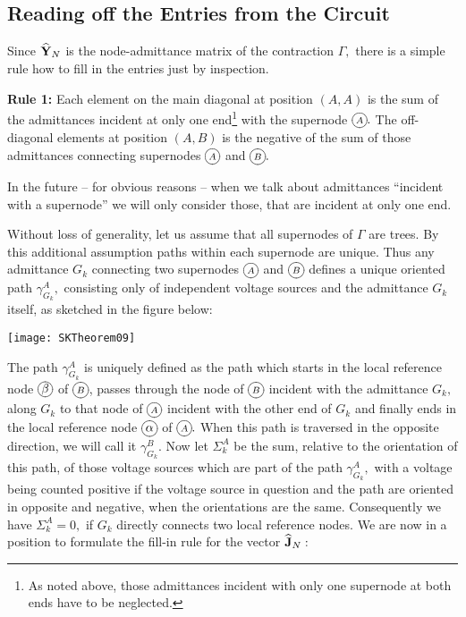 \documentclass[10pt,journal,twocolumn,pagenumbers]{IEEEtran}
\begin{document}
\subsection{Reading off the Entries from the Circuit}

Since $\widehat{\bf Y}_N$ is the node-admittance matrix of the contraction $\widehat{\Gamma},$ there is a simple rule how to fill in the entries just by inspection.

\smallskip
{\bf Rule 1:}
Each element on the main diagonal at position $(A,A)$
is the sum of the admittances incident at only one end\footnote{
As noted above, those admittances incident with only one super\-node at both ends have to be neglected.
} 
with the supernode ${\xy*+{\scriptstyle{A}}*\cir{}\endxy}.$ The off-diagonal elements at position $(A,B)$
is the negative of the sum of those admittances connecting supernodes ${\xy*+{\scriptstyle{A}}*\cir{}\endxy}$ and ${\xy*+{\scriptstyle{B}}*\cir{}\endxy}.$

\smallskip
In the future -- for obvious reasons -- when we talk about admittances ``incident with a supernode'' we will only consider those, that are incident at only one end.

Without loss of generality, let us assume that all super\-nodes of $\Gamma$ are trees. By this additional assumption paths within each supernode are unique. Thus any admittance $G_k$ connecting two supernodes ${\xy*+{\scriptstyle{A}}*\cir{}\endxy}$ and ${\xy*+{\scriptstyle{B}}*\cir{}\endxy}$ defines a unique oriented path $\gamma_{G_k}^A,$ consisting only of independent voltage sources and the admittance $G_k$ itself, as sketched in the figure below:

\medskip
\begin{center}
\vskip -0.3cm
{\texttt{[image: SKTheorem09]}}
\vskip -1.8cm
\end{center}
The path $\gamma_{G_k}^A$ is uniquely defined as the path which starts in the local reference node ${\xy*+{{\beta}}*\cir{}\endxy}$ of ${\xy*+{\scriptstyle{B}}*\cir{}\endxy}$, passes through the node of ${\xy*+{\scriptstyle{B}}*\cir{}\endxy}$ incident with the admittance $G_k,$ along $G_k$ to that node of ${\xy*+{\scriptstyle{A}}*\cir{}\endxy}$ incident with the other end of $G_k$ and finally ends in the local reference node ${\xy*+{{\alpha}}*\cir{}\endxy}$ of ${\xy*+{\scriptstyle{A}}*\cir{}\endxy}.$ When this path is traversed in the opposite direction, we will call it $\gamma_{G_k}^{B}.$ Now let $\Sigma_k^{A}$ be the sum, relative to the orientation of this path, of those voltage sources which are part of the path $\gamma_{G_k}^{A},$ with a voltage being counted positive if the voltage source in question and the path are oriented in opposite and negative, when the orientations are the same. Consequently we have $\Sigma_k^{A}=0,$ if $G_k$ directly connects two local reference nodes.
We are now in a position to formulate the fill-in rule for the vector $\widehat{\bf J}_N:$
\end{document}
